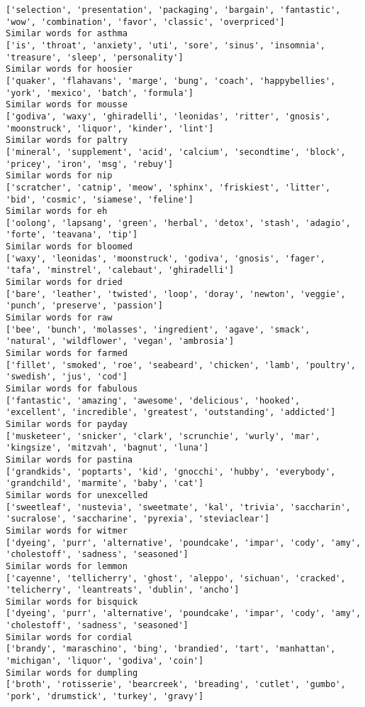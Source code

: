 \documentclass[11pt]{article}
\begin{document}
\begin{Verbatim}[commandchars=\\\{\}]
['selection', 'presentation', 'packaging', 'bargain', 'fantastic', 'wow', 'combination', 'favor', 'classic', 'overpriced']
Similar words for asthma
['is', 'throat', 'anxiety', 'uti', 'sore', 'sinus', 'insomnia', 'treasure', 'sleep', 'personality']
Similar words for hoosier
['quaker', 'flahavans', 'marge', 'bung', 'coach', 'happybellies', 'york', 'mexico', 'batch', 'formula']
Similar words for mousse
['godiva', 'waxy', 'ghiradelli', 'leonidas', 'ritter', 'gnosis', 'moonstruck', 'liquor', 'kinder', 'lint']
Similar words for paltry
['mineral', 'supplement', 'acid', 'calcium', 'secondtime', 'block', 'pricey', 'iron', 'msg', 'rebuy']
Similar words for nip
['scratcher', 'catnip', 'meow', 'sphinx', 'friskiest', 'litter', 'bid', 'cosmic', 'siamese', 'feline']
Similar words for eh
['oolong', 'lapsang', 'green', 'herbal', 'detox', 'stash', 'adagio', 'forte', 'teavana', 'tip']
Similar words for bloomed
['waxy', 'leonidas', 'moonstruck', 'godiva', 'gnosis', 'fager', 'tafa', 'minstrel', 'calebaut', 'ghiradelli']
Similar words for dried
['bare', 'leather', 'twisted', 'loop', 'doray', 'newton', 'veggie', 'punch', 'preserve', 'passion']
Similar words for raw
['bee', 'bunch', 'molasses', 'ingredient', 'agave', 'smack', 'natural', 'wildflower', 'vegan', 'ambrosia']
Similar words for farmed
['fillet', 'smoked', 'roe', 'seabeard', 'chicken', 'lamb', 'poultry', 'swedish', 'jus', 'cod']
Similar words for fabulous
['fantastic', 'amazing', 'awesome', 'delicious', 'hooked', 'excellent', 'incredible', 'greatest', 'outstanding', 'addicted']
Similar words for payday
['musketeer', 'snicker', 'clark', 'scrunchie', 'wurly', 'mar', 'kingsize', 'mitzvah', 'bagnut', 'luna']
Similar words for pastina
['grandkids', 'poptarts', 'kid', 'gnocchi', 'hubby', 'everybody', 'grandchild', 'marmite', 'baby', 'cat']
Similar words for unexcelled
['sweetleaf', 'nustevia', 'sweetmate', 'kal', 'trivia', 'saccharin', 'sucralose', 'saccharine', 'pyrexia', 'steviaclear']
Similar words for witmer
['dyeing', 'purr', 'alternative', 'poundcake', 'impar', 'cody', 'amy', 'cholestoff', 'sadness', 'seasoned']
Similar words for lemmon
['cayenne', 'tellicherry', 'ghost', 'aleppo', 'sichuan', 'cracked', 'telicherry', 'leantreats', 'dublin', 'ancho']
Similar words for bisquick
['dyeing', 'purr', 'alternative', 'poundcake', 'impar', 'cody', 'amy', 'cholestoff', 'sadness', 'seasoned']
Similar words for cordial
['brandy', 'maraschino', 'bing', 'brandied', 'tart', 'manhattan', 'michigan', 'liquor', 'godiva', 'coin']
Similar words for dumpling
['broth', 'rotisserie', 'bearcreek', 'breading', 'cutlet', 'gumbo', 'pork', 'drumstick', 'turkey', 'gravy']

\end{Verbatim}
\end{document}
